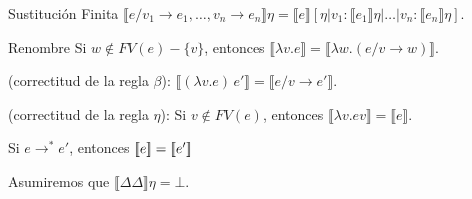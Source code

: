     \begin{theorem}{Sustitución Finita} $\llbracket e/v_1\to e_1, \ldots,
      v_n\to e_n\rrbracket\eta = \llbracket e\rrbracket[\eta|v_1:
      \llbracket e_1\rrbracket\eta|\ldots|v_n:\llbracket e_n\rrbracket\eta]$.
    \end{theorem}
    
    \begin{theorem}{Renombre} Si $w \not\in FV(e)-\{v\}$, entonces
      $\llbracket\lambda v.e\rrbracket = \llbracket\lambda w.(e/v\to w)\rrbracket$.
    \end{theorem}
        
    \begin{property}(correctitud de la regla $\beta$): $\llbracket(\lambda v.e)\, e'\rrbracket = \llbracket e/v\to e'\rrbracket$.
    \end{property}
        
    \begin{property}
      (correctitud de la regla $\eta$): Si $v \not\in FV(e)$, entonces
      $\llbracket\lambda v.e v\rrbracket = \llbracket e\rrbracket$.
    \end{property}

    \begin{corollary}
      Si $e \to^{\ast} e'$, entonces $[\![e]\!] = [\![e']\!]$
    \end{corollary}
        
    \PN Asumiremos que $\llbracket\Delta \Delta\rrbracket\eta = \bot$.

